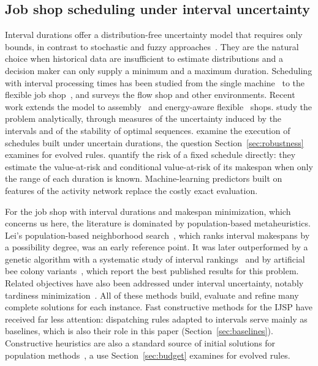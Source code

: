\documentclass[review,authoryear,11pt]{elsarticle}
\begin{document}
\subsection{Job shop scheduling under interval uncertainty}
Interval durations offer a distribution-free uncertainty model that
requires only bounds, in contrast to stochastic and fuzzy
approaches~\citep{Palacios2015}. They are the natural choice when
historical data are insufficient to estimate distributions and a
decision maker can only supply a minimum and a maximum duration.
Scheduling with interval processing times has been studied from the
single machine~\citep{Allahverdi2014} to the flexible job
shop~\citep{Xu2023}, and \citet{Allahverdi2022} surveys the flow shop and
other environments. Recent work extends the model to
assembly~\citep{Zheng2024} and energy-aware flexible~\citep{Afsar2025}
shops. \citet{Sotskov2013} study the problem analytically, through
measures of the uncertainty induced by the intervals and of the
stability of optimal sequences. \citet{Sotskov2020} examine the
execution of schedules built under uncertain durations, the question
Section~\ref{sec:robustness} examines for evolved rules.
\citet{Calamita2025} quantify the risk of a fixed schedule directly:
they estimate the value-at-risk and conditional value-at-risk of its
makespan when only the range of each duration is known.
Machine-learning predictors built on features of the activity network
replace the costly exact evaluation.

For the job shop with interval durations and makespan minimization,
which concerns us here, the literature is dominated by population-based
metaheuristics. Lei's population-based neighborhood
search~\citep{Lei2011}, which ranks interval makespans by a possibility
degree, was an early reference point. It was later outperformed by a
genetic algorithm with a systematic study of interval
rankings~\citep{DiazGA2020} and by artificial bee colony
variants~\citep{DiazABC2022,DiazFEABC2023,DiazICAE2023}, which report
the best published results for this problem. Related objectives have
also been addressed under interval uncertainty, notably tardiness
minimization~\citep{DiazTardiness2022}. All of these methods build,
evaluate and refine many complete solutions for each instance. Fast
constructive methods for the IJSP have received far less attention:
dispatching rules adapted to intervals serve mainly as baselines, which
is also their role in this paper (Section~\ref{sec:baselines}).
Constructive heuristics are also a standard source of initial solutions
for population methods~\citep{Kazimipour2014}, a use
Section~\ref{sec:budget} examines for evolved rules.
\end{document}
